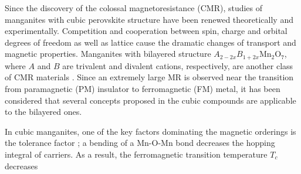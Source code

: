 \def\geqap{\,\raise 2pt \hbox{$>\kern-11pt \lower 5pt \hbox{$\sim$}$}\,}
\def\leqap{\,\raise 2pt \hbox{$<\kern-10pt \lower 5pt \hbox{$\sim$}$}\,}
\makeatletter
\makeatother

\draft
{}
\narrowtext
Since the discovery of the colossal magnetoresistance (CMR),
studies of manganites with cubic perovskite structure
have been renewed theoretically and experimentally.
Competition and cooperation
between spin, charge and orbital degrees of freedom
as well as lattice cause the dramatic
changes of transport and magnetic properties.
Manganites with bilayered structure $A_{2-2x}B_{1+2x}$Mn$_2$O$_7$,
where $A$ and $B$ are trivalent and divalent cations, respectively,
are another class of CMR materials \cite{moritomo,kimura2}.
Since an extremely large MR is observed near the transition
from paramagnetic (PM) insulator to ferromagnetic (FM) metal,
it has been considered that several concepts proposed in the cubic compounds
are applicable to the bilayered ones.
\par
In cubic manganites,
one of the key factors dominating the magnetic orderings
is the tolerance factor \cite{hwang};
a bending of a Mn-O-Mn bond
decreases the hopping integral of carriers.
As a result,
the ferromagnetic transition temperature $T_c$ decreases
